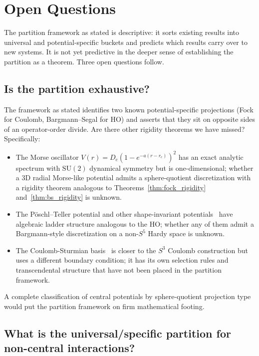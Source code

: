 \documentclass[twocolumn,pra,amsmath,amssymb,superscriptaddress]{revtex4-2}
\begin{document}
\section{Open Questions}
\label{sec:open}

The partition framework as stated is descriptive: it sorts existing
results into universal and potential-specific buckets and predicts
which results carry over to new systems.  It is not yet predictive
in the deeper sense of establishing the partition as a theorem.
Three open questions follow.

\subsection{Is the partition exhaustive?}

The framework as stated identifies two known potential-specific
projections (Fock for Coulomb, Bargmann--Segal for HO) and asserts
that they sit on opposite sides of an operator-order divide.  Are
there other rigidity theorems we have missed?  Specifically:

\begin{itemize}
\item The Morse oscillator $V(r) = D_e(1 - e^{-a(r - r_e)})^2$ has
  an exact analytic spectrum with $\mathrm{SU}(2)$ dynamical
  symmetry but is one-dimensional; whether a 3D radial Morse-like
  potential admits a sphere-quotient discretization with a rigidity
  theorem analogous to Theorems~\ref{thm:fock_rigidity}
  and~\ref{thm:bs_rigidity} is unknown.
\item The P\"oschl--Teller potential and other shape-invariant
  potentials~\cite{infeld_hull1951,cooper_khare1995} have algebraic
  ladder structure analogous to the HO; whether any of them admit
  a Bargmann-style discretization on a non-$S^5$ Hardy space is
  unknown.
\item The Coulomb-Sturmian basis~\cite{paper8_9} is closer to the
  $S^3$ Coulomb construction but uses a different boundary
  condition; it has its own selection rules and transcendental
  structure that have not been placed in the partition framework.
\end{itemize}

A complete classification of central potentials by sphere-quotient
projection type would put the partition framework on firm
mathematical footing.

\subsection{What is the universal/specific partition for non-central
interactions?}
\end{document}
